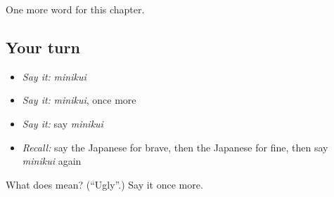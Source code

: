 \begin{grammarlens}[title={What you've built}]
One more word for this chapter.
\end{grammarlens}

\subsection*{Your turn}
\begin{itemize}
\raggedright
  \item \emph{Say it:} \emph{minikui}
  \item \emph{Say it:} \emph{minikui}, once more
  \item \emph{Say it:} say \emph{minikui}
  \item \emph{Recall:} say the Japanese for brave, then the Japanese for fine, then say \emph{minikui} again
\end{itemize}

\begin{tcolorbox}[breakable,colback=teal!4,colframe=teal!35!black,title={Before you move on}]
What does  mean? (\textquotedblleft{}Ugly\textquotedblright{}.) Say it once more.
\end{tcolorbox}
